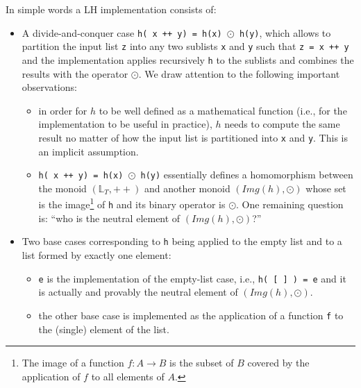 \documentclass[acmsmall,review]{acmart}\settopmatter{printfolios=true,printccs=false,printacmref=false}
\begin{document}
In simple words a LH implementation consists of:
\begin{itemize}
    \item[(1)] A divide-and-conquer case 
            {\tt h( x ++ y) = h(x) $\odot$ h(y)},
            which allows to partition the input list {\tt z} 
            into any two sublists {\tt x} and {\tt y} such that
            {\tt z = x ++ y} and the implementation
            applies recursively {\tt h} to the sublists and 
            combines the results with the operator $\odot$.   
            We draw attention to the following important observations:
        \begin{itemize}
            \item[(a)] in order for $h$ to be well defined as a mathematical 
            function (i.e., for the implementation to be useful in practice), 
            $h$ needs to compute the same result no matter of how the input 
            list is partitioned into {\tt x} and {\tt y}. This is an implicit 
            assumption.

            \item[(b)] {\tt h( x ++ y) = h(x) $\odot$ h(y)} essentially
            defines a homomorphism between the monoid $(\mathbb{L}_T,++)$ 
            and another monoid $(Img(h),\odot)$ whose set is the
            image\footnote{
                The image of a function $f : A \rightarrow B$ is the
                subset of $B$ covered by the application of $f$ to
                all elements of $A$.
            } of {\tt h} and its binary operator is $\odot$.
            One remaining question is: ``who is the neutral element of 
            $(Img(h),\odot)$?''
        \end{itemize}

    \item[(2)] Two base cases corresponding to {\tt h} being applied to 
                the empty list and to a list formed by exactly one element:
        \begin{itemize}

            \item[(a)] {\tt e} is the implementation of the
                empty-list case, i.e., {\tt h( [ ] ) = e} and  
                it is actually and provably the neutral element of $(Img(h),\odot)$.
            \item[(b)] the other base case is implemented as
                the application of a function {\tt f} to the
                (single) element of the list.
        \end{itemize}
\end{itemize}
\end{document}
